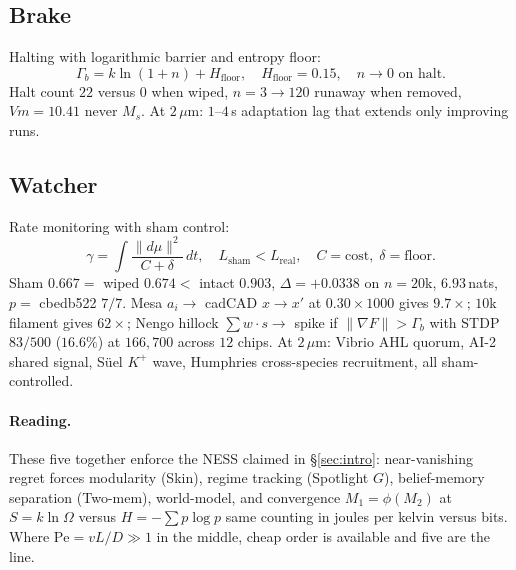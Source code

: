 \documentclass[12pt,a4paper]{article}
\newcommand{\Pe}{\mathrm{Pe}}
\begin{document}
\subsection{Brake}
Halting with logarithmic barrier and entropy floor:
\begin{equation}
\Gamma_b = k\ln(1+n) + H_{\mathrm{floor}},\quad H_{\mathrm{floor}} = 0.15,\quad n \to 0 \text{ on halt}.
\end{equation}
Halt count $22$ versus $0$ when wiped, $n=3\to120$ runaway when removed, $Vm=10.41$ never $M_s$. At $2\,\mu\mathrm{m}$: $1$--$4$\,s adaptation lag that extends only improving runs.

\subsection{Watcher}
Rate monitoring with sham control:
\begin{equation}
\gamma = \int \frac{\lVert d\mu\rVert^2}{C+\delta}\, dt,\quad L_{\mathrm{sham}} < L_{\mathrm{real}},\quad C = \text{cost},\; \delta = \text{floor}.
\end{equation}
Sham $0.667 = $ wiped $0.674 <$ intact $0.903$, $\Delta = +0.0338$ on $n=20$k, $6.93$\,nats, $p=$ cbedb522 $7/7$. Mesa $a_i \to$ cadCAD $x \to x'$ at $0.30\times1000$ gives $9.7\times$; $10$k filament gives $62\times$; Nengo hillock $\sum w\cdot s \to$ spike if $\lVert \nabla F\rVert > \Gamma_b$ with STDP $83/500$ ($16.6\%$) at $166{,}700$ across $12$ chips. At $2\,\mu\mathrm{m}$: Vibrio AHL quorum, AI-2 shared signal, S\"{u}el $K^+$ wave, Humphries cross-species recruitment, all sham-controlled.

\paragraph{Reading.} These five together enforce the NESS claimed in \S\ref{sec:intro}: near-vanishing regret forces modularity (Skin), regime tracking (Spotlight $G$), belief-memory separation (Two-mem), world-model, and convergence $M_1=\phi(M_2)$ at $S=k\ln\Omega$ versus $H=-\sum p\log p$ same counting in joules per kelvin versus bits. Where $\Pe = vL/D \gg 1$ in the middle, cheap order is available and five are the line.
\end{document}
